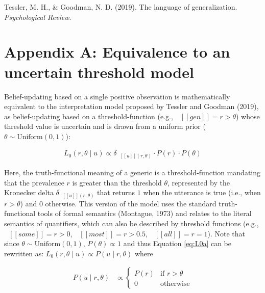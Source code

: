 \documentclass[floatsintext,doc]{apa6}
\begin{document}
\leavevmode\hypertarget{ref-Tessler2019psychrev}{}%
Tessler, M. H., \& Goodman, N. D. (2019). The language of generalization. \emph{Psychological Review}.

\newpage
\section{Appendix A: Equivalence to an uncertain threshold model}

Belief-updating based on a single positive observation is mathematically equivalent to the interpretation model proposed by Tessler and Goodman (2019), as belief-updating based on a threshold-function (e.g., \(\mbox{ $[\![ gen ]\!]$} = r > \theta\)) whose threshold value is uncertain and is drawn from a uniform prior (\(\theta \sim \text{Uniform}(0, 1)\)):

\begin{align}
L_0(r, \theta \mid u) \propto {\delta_{\mbox{ $[\![ u ]\!]$}(r, \theta)} \cdot P(r) \cdot P(\theta)} \label{eq:L0a}
\end{align}

Here, the truth-functional meaning of a generic is a threshold-function mandating that the prevalence \(r\) is greater than the threshold \(\theta\), represented by the Kronecker delta \(\delta_{\mbox{ $[\![ u ]\!]$}(r, \theta)}\) that returns \(1\) when the utterance is true (i.e., when \(r > \theta\)) and \(0\) otherwise.
%
%
This version of the model uses the standard truth-functional tools of formal semantics (Montague, 1973) and relates to the literal semantics of quantifiers, which can also be described by threshold functions (e.g., \(\mbox{ $[\![ some ]\!]$} = r > 0\), \(\mbox{ $[\![ most ]\!]$} = r > 0.5\), \(\mbox{ $[\![ all ]\!]$} = r = 1\)).
Note that since \(\theta \sim \text{Uniform}(0, 1)\),  \(P(\theta) \propto 1\)  and thus Equation \ref{eq:L0a} can be rewritten as: \(L_0(r, \theta \mid u) \propto P(u \mid r, \theta)\) where

\begin{align}
P(u \mid r, \theta)  &\propto \begin{cases}
P(r) & \text{if } r > \theta \\
0 & \text{otherwise} \end{cases} \label{eq:delta2}
\end{align}
\end{document}
